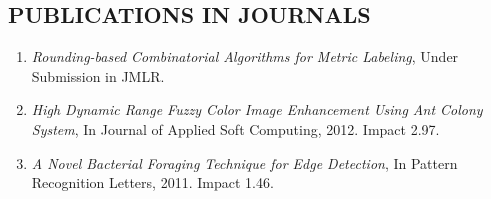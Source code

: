 \documentclass{res}
\begin{document}
\begin{resume}
        \section{PUBLICATIONS IN JOURNALS} 
        \begin{enumerate}
        \item \emph{Rounding-based Combinatorial Algorithms for Metric Labeling}, {Under Submission in JMLR}.
        \item \emph{High Dynamic Range Fuzzy Color Image Enhancement Using Ant Colony System}, {In Journal of Applied Soft Computing}, 2012. Impact 2.97.
        \item \emph{A Novel Bacterial Foraging Technique for Edge Detection}, {In Pattern Recognition Letters}, 2011. Impact 1.46.

        \end{enumerate}  



\end{resume}
\end{document}
